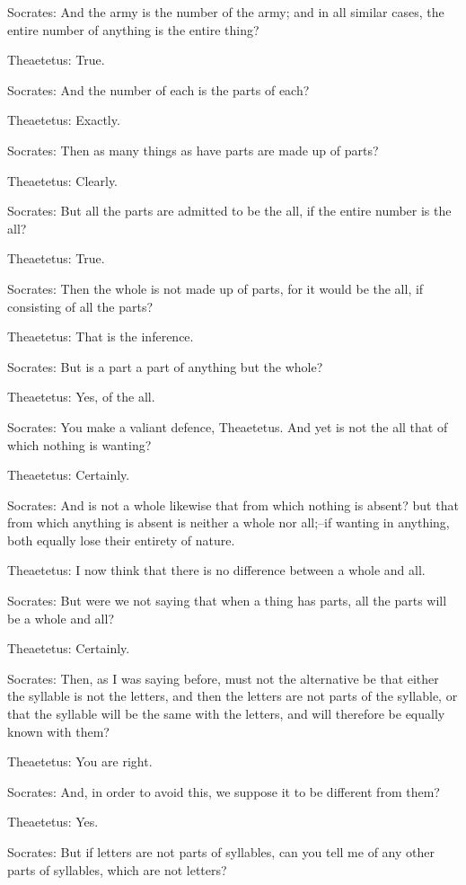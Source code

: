 Socrates: And the army is the number of the army; and in all similar
cases, the entire number of anything is the entire thing?

Theaetetus: True.

Socrates: And the number of each is the parts of each?

Theaetetus: Exactly.

Socrates: Then as many things as have parts are made up of parts?

Theaetetus: Clearly.

Socrates: But all the parts are admitted to be the all, if the entire
number is the all?

Theaetetus: True.

Socrates: Then the whole is not made up of parts, for it would be the
all, if consisting of all the parts?

Theaetetus: That is the inference.

Socrates: But is a part a part of anything but the whole?

Theaetetus: Yes, of the all.

Socrates: You make a valiant defence, Theaetetus. And yet is not the all
that of which nothing is wanting?

Theaetetus: Certainly.

Socrates: And is not a whole likewise that from which nothing is absent?
but that from which anything is absent is neither a whole nor all;--if
wanting in anything, both equally lose their entirety of nature.

Theaetetus: I now think that there is no difference between a whole and
all.

Socrates: But were we not saying that when a thing has parts, all the
parts will be a whole and all?

Theaetetus: Certainly.

Socrates: Then, as I was saying before, must not the alternative be that
either the syllable is not the letters, and then the letters are not
parts of the syllable, or that the syllable will be the same with the
letters, and will therefore be equally known with them?

Theaetetus: You are right.

Socrates: And, in order to avoid this, we suppose it to be different
from them?

Theaetetus: Yes.

Socrates: But if letters are not parts of syllables, can you tell me of
any other parts of syllables, which are not letters?

